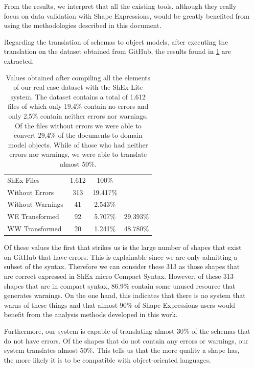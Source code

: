 From the results, we interpret that all the existing tools, although they really
focus on data validation with Shape Expressions, would be greatly benefited
from using the methodologies described in this document.

Regarding the translation of schemas to object models, after executing the
translation on the dataset obtained from GitHub, the results found in \cref{tb:real-datase-results}
are extracted.

\begin{table}
  \centering
  \caption[Values obtained after compiling all the elements of our real case dataset with the ShEx-Lite system]{Values obtained after compiling all the
  elements of our real case dataset with the ShEx-Lite system. The dataset contains a total of 1.612 files of which only 19,4\%
  contain no errors and only 2,5\% contain neither errors nor warnings. Of the files without errors we were able to convert 29,4\%
  of the documents to domain model objects. While of those who had neither errors nor warnings, we were able to translate almost 50\%.}
  \label{tb:real-datase-results}
  \begin{tabular}{l|c|cc}
    ShEx Files       & 1.612 & 100\%                        &          \\ \cline{1-3}
    Without Errors   & 313   & 19.417\%                     &          \\ \cline{1-3}
    Without Warnings & 41    & 2.543\%                      &          \\ \cline{1-3}
    WE Transformed   & 92    & \multicolumn{1}{c|}{5.707\%} & 29.393\% \\ \hline
    WW Transformed   & 20    & \multicolumn{1}{c|}{1.241\%} & 48.780\%
  \end{tabular}
\end{table}

Of these values the first that strikes us is the large number of shapes that exist on GitHub
that have errors. This is explainable since we are only admitting a subset of the syntax.
Therefore we can consider these 313 as those shapes that are correct expressed in ShEx micro
Compact Syntax. However, of these 313 shapes that are in compact syntax, 86.9\% contain some
unused resource that generates warnings. On the one hand, this indicates that there is no system
that warns of these things and that almost 90\% of Shape Expressions users would benefit from the
analysis methods developed in this work.

Furthermore, our system is capable of translating almost 30\% of the schemas that do not have errors.
Of the shapes that do not contain any errors or warnings, our system translates almost 50\%. This tells
us that the more quality a shape has, the more likely it is to be compatible with object-oriented languages.